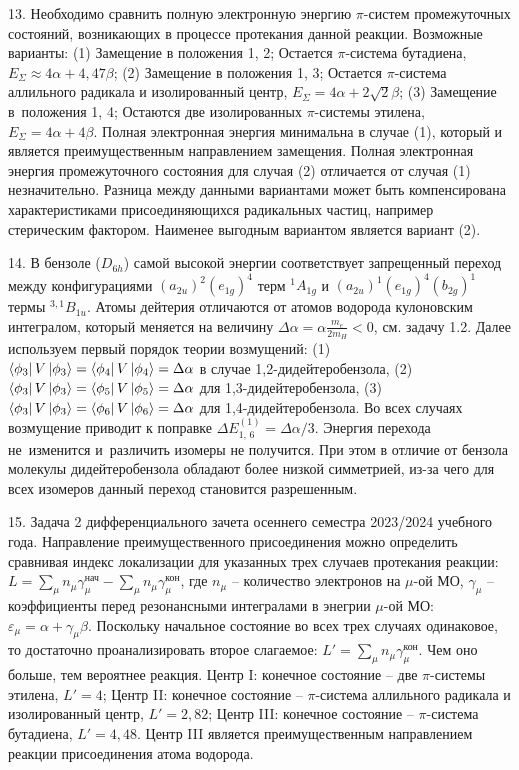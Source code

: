 13. Необходимо сравнить полную электронную энергию $\pi$-систем промежуточных состояний, возникающих в процессе протекания данной реакции. Возможные варианты: (1) Замещение в положения 1, 2; Остается $\pi$-система бутадиена, $E_{\Sigma}\approx 4\alpha+4,47\beta$; (2) Замещение в положения 1, 3; Остается $\pi$-система аллильного радикала и изолированный центр, $E_{\Sigma}= 4\alpha+2\sqrt2\beta$; (3) Замещение в~положения 1, 4; Остаются две изолированных $\pi$-системы этилена, $E_{\Sigma}= 4\alpha+4\beta$. Полная электронная энергия минимальна в случае (1), который и является преимущественным направлением замещения. Полная электронная энергия промежуточного состояния для случая (2) отличается от случая (1) незначительно. Разница между данными вариантами может быть компенсирована характеристиками присоединяющихся радикальных частиц, например стерическим фактором. Наименее выгодным вариантом является вариант (2).\par
14. В бензоле ($D_{6h}$) самой высокой энергии соответствует запрещенный переход между конфигурациями $(a_{2u})^2(e_{1g})^4$ терм $^1{A_{1g}}$ и $(a_{2u})^1(e_{1g})^4(b_{2g})^1$ термы $^{3,1}B_{1u}$. Атомы дейтерия отличаются от атомов водорода кулоновским интегралом, который меняется на величину $\Delta \alpha =\alpha\frac{m_e}{2m_H} < 0$, см. задачу 1.2. Далее используем первый порядок теории возмущений: (1) $\bra{\phi_3}V\ket{\phi_3}=\bra{\phi_4}V\ket{\phi_4}=\Delta \alpha$ в случае 1,2-дидейтеробензола, (2)~$\bra{\phi_3}V\ket{\phi_3}=\bra{\phi_5}V\ket{\phi_5}=\Delta \alpha$ для 1,3-дидейтеробензола, (3)~$\bra{\phi_3}V\ket{\phi_3}=\bra{\phi_6}V\ket{\phi_6}=\Delta \alpha $ для 1,4-дидейтеробензола. Во всех случаях возмущение приводит к поправке $\Delta E_{1,\,6}^{(1)}= \Delta \alpha/3 $. Энергия перехода не~изменится и~различить изомеры не получится. При этом в отличие от бензола молекулы дидейтеробензола обладают более низкой симметрией, из-за чего для всех изомеров данный переход становится разрешенным.\par
15. Задача 2 дифференциального зачета осеннего семестра 2023/2024 учебного года. Направление преимущественного присоединения можно определить сравнивая индекс локализации для указанных трех случаев протекания реакции: $L=\sum_{\mu} n_{\mu}  \gamma_{\mu}^{\text{нач}} - \sum_{\mu} n_{\mu}  \gamma_{\mu}^{\text{кон}}$, где $n_{\mu}$ – количество электронов на $\mu$-ой МО, $\gamma_{\mu}$ – коэффициенты перед резонансными интегралами в энегрии $\mu$-ой МО: $\varepsilon_{\mu}=\alpha+\gamma_{\mu} \beta$. Поскольку начальное состояние во всех трех случаях одинаковое, то достаточно проанализировать второе слагаемое: $L'=\sum_{\mu} n_{\mu}  \gamma_{\mu}^{\text{кон}}$. Чем оно больше, тем вероятнее реакция. Центр I: конечное состояние – две $\pi$-системы этилена, $L'=4$; Центр II: конечное состояние – $\pi$-система аллильного радикала и изолированный центр, $L'=2,82$; Центр III: конечное состояние – $\pi$-система бутадиена, $L'=4,48$. Центр III является преимущественным направлением реакции присоединения атома водорода.\par
\newpage


